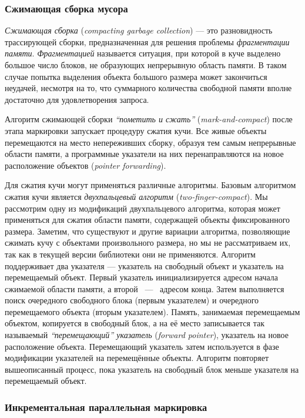 \subsubsection{Сжимающая сборка мусора}
\label{sec:two-finger-compact}

\emph{Сжимающая сборка} (\emph{compacting garbage collection}) --- это разновидность 
трассирующей сборки, предназначенная для решения проблемы \emph{фрагментации памяти}. 
\emph{Фрагментацией} называется ситуация, при которой в куче выделено большое число блоков, 
не образующих непрерывную область памяти. 
В таком случае попытка выделения объекта большого размера может закончиться неудачей, 
несмотря на то, что суммарного количества свободной памяти вполне достаточно для 
удовлетворения запроса. 

Алгоритм сжимающей сборки \emph{``пометить и сжать''} (\emph{mark-and-compact}) 
после этапа маркировки запускает процедуру сжатия кучи. 
Все живые объекты перемещаются на место непереживших сборку, образуя тем самым непрерывные 
области памяти, а программные указатели на них перенаправляются на новое 
расположение объектов (\emph{pointer forwarding}). 

Для сжатия кучи могут применяться различные алгоритмы. 
Базовым алгоритмом сжатия кучи является \emph{двухпальцевый алгоритм} 
(\emph{two-finger-compact}). 
Мы рассмотрим одну из модификаций двухпальцевого алгоритма, которая может применяться 
для сжатия области памяти, содержащей объекты фиксированного размера. 
Заметим, что существуют и другие вариации алгоритма, позволяющие сжимать кучу с объектами 
произвольного размера, но мы не рассматриваем их, так как в текущей версии библиотеки они 
не применяются. 
Алгоритм поддерживает два указателя --- указатель на свободный объект и 
указатель на перемещаемый объект. 
Первый указатель инициализируется адресом начала сжимаемой области памяти, 
а второй ~---~ адресом конца. 
Затем выполняется поиск очередного свободного блока (первым указателем) и 
очередного перемещаемого объекта (вторым указателем). 
Память, занимаемая перемещаемым объектом, копируется в свободный блок, 
а на её место записывается так называемый \emph{``перемещающий'' указатель} 
(\emph{forward pointer}), указатель на новое расположение объекта. 
Перемещающий указатель затем используется в фазе модификации указателей на 
перемещённые объекты. 
Алгоритм повторяет вышеописанный процесс, пока указатель на свободный блок 
меньше указателя на перемещаемый объект. 


\subsubsection{Инкрементальная параллельная маркировка}
\label{sec:inc_marking}

